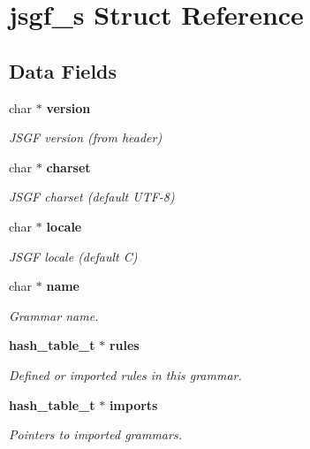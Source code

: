 \section{jsgf\+\_\+s Struct Reference}
\label{structjsgf__s}
\subsection*{Data Fields}
\begin{DoxyCompactItemize}
\item 
\mbox{\label{structjsgf__s_ad459d19b47134a9670ffa4e8c466c0df}} 
char $\ast$ \textbf{ version}
\begin{DoxyCompactList}\small\item\em J\+S\+GF version (from header) \end{DoxyCompactList}\item 
\mbox{\label{structjsgf__s_ac7cba2982a4c14503afbe1df5f208002}} 
char $\ast$ \textbf{ charset}
\begin{DoxyCompactList}\small\item\em J\+S\+GF charset (default U\+T\+F-\/8) \end{DoxyCompactList}\item 
\mbox{\label{structjsgf__s_a0423fa12efb23c307765d7d010908e0f}} 
char $\ast$ \textbf{ locale}
\begin{DoxyCompactList}\small\item\em J\+S\+GF locale (default C) \end{DoxyCompactList}\item 
\mbox{\label{structjsgf__s_ab418c438a9c7f7e8aee029f006897656}} 
char $\ast$ \textbf{ name}
\begin{DoxyCompactList}\small\item\em Grammar name. \end{DoxyCompactList}\item 
\textbf{ hash\+\_\+table\+\_\+t} $\ast$ \textbf{ rules}
\begin{DoxyCompactList}\small\item\em Defined or imported rules in this grammar. \end{DoxyCompactList}\item 
\textbf{ hash\+\_\+table\+\_\+t} $\ast$ \textbf{ imports}
\begin{DoxyCompactList}\small\item\em Pointers to imported grammars. \end{DoxyCompactList}\item 
\mbox{\label{structjsgf__s_af05b28c1350c76d64539403791522128}} 

\end{DoxyCompactItemize}
